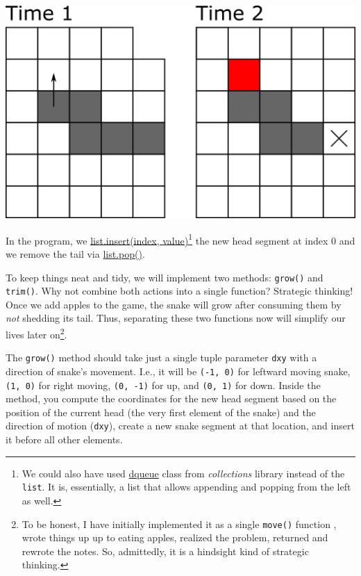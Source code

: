 \documentclass[
]{book}
\begin{document}
\includegraphics[width=14.36in]{images/snake-movement-2}

In the program, we \href{https://docs.python.org/3/tutorial/datastructures.html\#more-on-lists}{list.insert(index, value)}\footnote{We could also have used \href{https://docs.python.org/3/library/collections.html\#collections.deque}{dqueue} class from \emph{collections} library instead of the \texttt{list}. It is, essentially, a list that allows appending and popping from the left as well.} the new head segment at index 0 and we remove the tail via \href{https://docs.python.org/3/tutorial/datastructures.html\#more-on-lists}{list.pop()}.

To keep things neat and tidy, we will implement two methods: \texttt{grow()} and \texttt{trim()}. Why not combine both actions into a single function? Strategic thinking! Once we add apples to the game, the snake will grow after consuming them by \emph{not} shedding its tail. Thus, separating these two functions now will simplify our lives later on\footnote{To be honest, I have initially implemented it as a single \texttt{move()} function , wrote things up up to eating apples, realized the problem, returned and rewrote the notes. So, admittedly, it is a hindsight kind of strategic thinking.}.

The \texttt{grow()} method should take just a single tuple parameter \texttt{dxy} with a direction of snake's movement. I.e., it will be \texttt{(-1,\ 0)} for leftward moving snake, \texttt{(1,\ 0)} for right moving, \texttt{(0,\ -1)} for up, and \texttt{(0,\ 1)} for down. Inside the method, you compute the coordinates for the new head segment based on the position of the current head (the very first element of the snake) and the direction of motion (\texttt{dxy}), create a new snake segment at that location, and insert it before all other elements.
\end{document}
